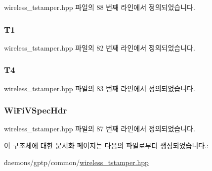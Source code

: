 wireless\+\_\+tstamper.\+hpp 파일의 88 번째 라인에서 정의되었습니다.

\subsubsection[{\texorpdfstring{T1}{T1}}]{ T1}\hypertarget{struct___t_i_m_i_n_g_m_s_m_t___r_e_q_u_e_s_t_a1965b8bc6a03c9475b77bf76010cc42f}{}\label{struct___t_i_m_i_n_g_m_s_m_t___r_e_q_u_e_s_t_a1965b8bc6a03c9475b77bf76010cc42f}


wireless\+\_\+tstamper.\+hpp 파일의 82 번째 라인에서 정의되었습니다.

\subsubsection[{\texorpdfstring{T4}{T4}}]{ T4}\hypertarget{struct___t_i_m_i_n_g_m_s_m_t___r_e_q_u_e_s_t_a4d070c49c8120152ba5cf1a5bc9c2b8b}{}\label{struct___t_i_m_i_n_g_m_s_m_t___r_e_q_u_e_s_t_a4d070c49c8120152ba5cf1a5bc9c2b8b}


wireless\+\_\+tstamper.\+hpp 파일의 83 번째 라인에서 정의되었습니다.

\subsubsection[{\texorpdfstring{Wi\+Fi\+V\+Spec\+Hdr}{WiFiVSpecHdr}}]{ Wi\+Fi\+V\+Spec\+Hdr}\hypertarget{struct___t_i_m_i_n_g_m_s_m_t___r_e_q_u_e_s_t_a833245209a0ea1388cc5eda2f9aacf4d}{}\label{struct___t_i_m_i_n_g_m_s_m_t___r_e_q_u_e_s_t_a833245209a0ea1388cc5eda2f9aacf4d}


wireless\+\_\+tstamper.\+hpp 파일의 87 번째 라인에서 정의되었습니다.



이 구조체에 대한 문서화 페이지는 다음의 파일로부터 생성되었습니다.\+:\begin{DoxyCompactItemize}
\item 
daemons/gptp/common/\hyperlink{wireless__tstamper_8hpp}{wireless\+\_\+tstamper.\+hpp}\end{DoxyCompactItemize}
